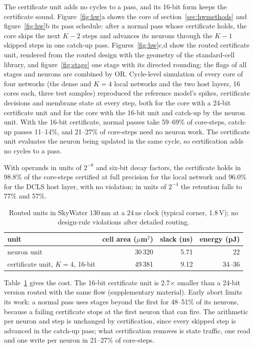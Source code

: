\documentclass{iopjournal}
\begin{document}
The certificate unit adds no cycles to a pass, and its 16-bit form keeps the certificate sound. Figure~\ref{fig:hw}a shows the core of section~\ref{sec:hwmethods} and figure~\ref{fig:hw}b its pass schedule: after a normal pass whose certificate holds, the core skips the next $K-2$ steps and advances its neurons through the $K-1$ skipped steps in one catch-up pass. Figures~\ref{fig:hw}c,d show the routed certificate unit, rendered from the routed design with the geometry of the standard-cell library, and figure~\ref{fig:stage} one stage with its directed rounding; the flags of all stages and neurons are combined by OR. Cycle-level simulation of every core of four networks (the dense and $K=4$ local networks and the two host layers, 16 cores each, three test samples) reproduced the reference model's spikes, certificate decisions and membrane state at every step, both for the core with a 24-bit certificate unit and for the core with the 16-bit unit and catch-up by the neuron unit. With the 16-bit certificate, normal passes take 59--69\% of core-steps, catch-up passes 11--14\%, and 21--27\% of core-steps need no neuron work. The certificate unit evaluates the neuron being updated in the same cycle, so certification adds no cycles to a pass.

With operands in units of $2^{-8}$ and six-bit decay factors, the certificate holds in 98.8\% of the core-steps certified at full precision for the local network and 96.0\% for the DCLS host layer, with no violation; in units of $2^{-4}$ the retention falls to 77\% and 57\%.

\begin{table}
\caption{\label{tab:hw}Routed units in SkyWater 130\,nm at a 24\,ns clock (typical corner, 1.8\,V); no design-rule violations after detailed routing.}
\centering
\begin{tabular}{lrrr}
\hline
unit & cell area ($\mu$m$^2$) & slack (ns) & energy (pJ) \\
\hline
neuron unit                                  & 30\,320 & 5.71 & 22 \\
certificate unit, $K=4$, 16-bit              & 49\,381 & 9.12 & 34--36 \\
\hline
\end{tabular}
\end{table}

Table~\ref{tab:hw} gives the cost. The 16-bit certificate unit is 2.7$\times$ smaller than a 24-bit version routed with the same flow (supplementary material). Early abort limits its work: a normal pass uses stages beyond the first for 48--51\% of its neurons, because a failing certificate stops at the first neuron that can fire. The arithmetic per neuron and step is unchanged by certification, since every skipped step is advanced in the catch-up pass; what certification removes is state traffic, one read and one write per neuron in 21--27\% of core-steps.
\end{document}
